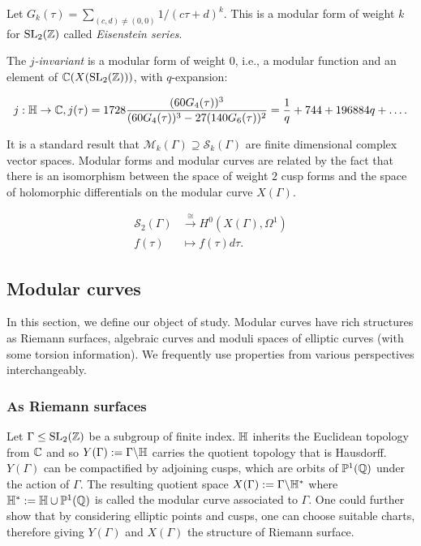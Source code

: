 \begin{example}
Let $G_k(\tau) = \sum_{(c,d) \not = (0,0)} 1/(c\tau + d)^k$. This is a modular form of weight $k$ for $\operatorname{SL}_2(\mathbb{Z})$ called \textit{Eisenstein series}. 

    The \textit{$j$-invariant} is a modular form of weight $0$, i.e., a modular function and an element of $\mathbb{C}(X(\operatorname{SL}_2(\mathbb{Z})))$, with $q$-expansion:

    \begin{align*}
        j: \mathbb{H} \rightarrow \mathbb{C}, j(\tau) = 1728 \frac{(60 G_4(\tau))^3}{(60 G_4(\tau))^3 - 27 (140 G_6(\tau))^2} = \frac{1}{q} + 744 + 196884q + \ldots.
    \end{align*}
\end{example}

It is a standard result that $\mathcal{M}_k(\Gamma) \supseteq \mathcal{S}_k(\Gamma)$ are finite dimensional complex vector spaces. Modular forms and modular curves are related by the fact that there is an isomorphism between the space of weight $2$ cusp forms and the space of holomorphic differentials on the modular curve $X(\Gamma)$. 

\begin{align*}
\mathcal{S}_2(\Gamma) &\xrightarrow{\cong} H^0(X(\Gamma),\Omega^1) \\
f(\tau) &\mapsto f(\tau) d\tau.
\end{align*}



\subsection{Modular curves}
In this section, we define our object of study. Modular curves have rich structures as Riemann surfaces, algebraic curves and moduli spaces of elliptic curves (with some torsion information). We frequently use properties from various perspectives interchangeably.

\subsubsection{As Riemann surfaces}
Let $\Gamma \leq \operatorname{SL}_2(\mathbb{Z})$ be a subgroup of finite index. $\mathbb{H}$ inherits the Euclidean topology from $\mathbb{C}$ and so $Y(\Gamma) := \Gamma \backslash \mathbb{H}$ carries the quotient topology that is Hausdorff. $Y(\Gamma)$ can be compactified by adjoining cusps, which are orbits of $\mathbb{P}^1(\mathbb{Q})$ under the action of $\Gamma$. The resulting quotient space $X(\Gamma) := \Gamma \backslash \mathbb{H}^*$ where $\mathbb{H}^* := \mathbb{H} \cup \mathbb{P}^1(\mathbb{Q})$ is called the modular curve associated to $\Gamma$. One could further show that by considering elliptic points and cusps, one can choose suitable charts, therefore giving $Y(\Gamma)$ and $X(\Gamma)$ the structure of Riemann surface.


